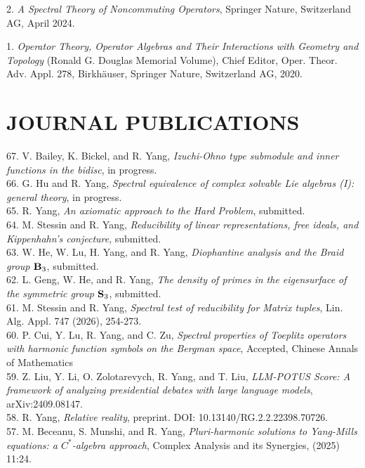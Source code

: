 \documentclass[12pt]{res} %
\begin{document}
\begin{resume}
\vspace{5mm}

2. {\em A Spectral Theory of Noncommuting Operators}, Springer Nature, Switzerland AG, April 2024.

1. {\em Operator Theory, Operator Algebras and Their Interactions with Geometry and Topology} (Ronald G. Douglas Memorial Volume), Chief Editor, Oper. Theor. Adv. Appl. 278, Birkh\"auser, Springer Nature, Switzerland AG, 2020.

\section{JOURNAL PUBLICATIONS}

\vspace{5mm}
67. V. Bailey, K. Bickel, and R. Yang, {\em Izuchi-Ohno type submodule and inner functions in the bidisc}, in progress.\\
66. G. Hu and R. Yang, {\em Spectral equivalence of complex solvable Lie algebras (I): general theory}, in progress.\\
65. R. Yang, {\em An axiomatic approach to the Hard Problem}, submitted.\\
64. M. Stessin and R. Yang, {\em Reducibility of linear representations, free ideals, and Kippenhahn's conjecture}, submitted.\\
63. W. He, W. Lu, H. Yang, and R. Yang, {\em Diophantine analysis and the Braid group ${\bf B}_3$}, submitted.\\
62. L. Geng, W. He, and R. Yang, {\em The density of primes in the eigensurface of the symmetric group ${\bf S}_3$}, submitted.\\
61. M. Stessin and R. Yang, {\em Spectral test of reducibility for Matrix tuples}, Lin. Alg. Appl. 747 (2026), 254-273.\\
60. P. Cui, Y. Lu, R. Yang, and C. Zu, {\em Spectral  properties of Toeplitz operators with harmonic function symbols on the Bergman space}, Accepted, Chinese Annals of Mathematics\\
59. Z. Liu, Y. Li, O. Zolotarevych, R. Yang, and T. Liu, {\em LLM-POTUS Score: A framework of analyzing presidential debates with large language models}, arXiv:2409.08147.\\
58. R. Yang, {\em Relative reality}, preprint. DOI: 10.13140/RG.2.2.22398.70726.\\
57. M. Beceanu, S. Munshi, and R. Yang, {\em Pluri-harmonic solutions to Yang-Mills equations: a $C^*$-algebra approach}, Complex Analysis and its Synergies, (2025) 11:24.\\

\end{resume}
\end{document}
